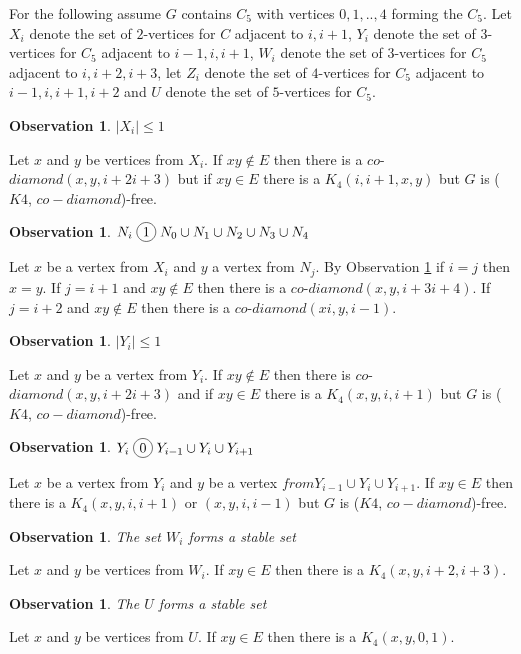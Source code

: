 \documentclass[12pt]{article}
\newcommand*\circled[1]{\tikz[baseline=(char.base)]{
            \node[shape=circle,draw,inner sep=2pt] (char) {#1};}}
\newtheorem{Observation}[Theorem]{Observation}
\def\KCD{($K4$, $co-diamond$)}
\begin{document}
For the following assume $G$ contains $C_5$ with vertices $0, 1, ..,4$ forming the $C_5$. Let $X_i$ denote the set of $2$-vertices for $C$ adjacent to $i, i+1$, $Y_i$ denote the set of $3$-vertices for $C_5$ adjacent to $i-1, i, i+1$, $W_i$ denote the set of $3$-vertices for $C_5$ adjacent to $i, i+2, i+3$, let $Z_i$ denote the set of $4$-vertices for $C_5$ adjacent to $i-1,i,i+1,i+2$  and $U$ denote the set of $5$-vertices for $C_5$.

\begin{Observation}\label{obs:Xi-is-one}
$|X_i| \leq 1$
\end{Observation}
 Let $x$ and $y$ be vertices from $X_i$. If $xy \not \in E$ then there is a $co$-$diamond (x,y,i+2i+3)$ but if $xy \in E$ there is a $K_4 (i, i+1, x, y)$ but $G$ is {\KCD}-free.

\begin{Observation}\label{obs:Xi-clique}
$N_i \;\circled{1}\; N_0 \cup N_1 \cup N_2 \cup N_3 \cup N_4$
\end{Observation} 
 Let $x$ be a vertex from $X_i$ and $y$ a vertex from $N_j$. By Observation \ref{obs:Xi-is-one} if $i = j$ then $x =y$. If $j = i + 1$ and $xy \not \in E$ then there is a $co$-$diamond (x, y, i+3i+4)$. If $ j =i +2$ and $xy \not \in E$ then there is a $co$-$diamond (xi, y, i-1)$.

\begin{Observation}\label{obs:Yi-is-one}
$|Y_i| \leq 1$
\end{Observation} 
 Let $x$ and $y$ be a vertex from $Y_i$. If $xy \not \in E$ then there is $co$-$diamond(x,y, i+2i+3)$ and if $xy \in E$ there is a $K_4 (x, y, i, i+1)$ but $G$ is {\KCD}-free.

\begin{Observation}\label{obs:Yi-co-joins}
$Y_i \;\circled{0}\; Y_{i-1} \cup Y_i \cup Y_{i+1}$
\end{Observation}
 Let $x$ be a vertex from $Y_i$ and $y$ be a vertex $from Y_{i-1} \cup Y_i \cup Y_{i+1}$. If $xy \in E$ then there is a $K_4 (x, y, i, i+1)$ or $(x, y, i, i-1)$ but $G$ is {\KCD}-free.

\begin{Observation}\label{obs:Wi-stable}
The set $W_i$ forms a stable set
\end{Observation}
 Let $x$ and $y$ be vertices from $W_i$. If $xy \in E$ then there is a $K_4 (x, y, i+2, i+3)$.

\begin{Observation}\label{obs:U-stable}
The $U$ forms a stable set
\end{Observation}
 Let $x$ and $y$ be vertices from $U$. If $xy \in E$ then there is a $K_4 (x, y, 0, 1)$.
\end{document}
